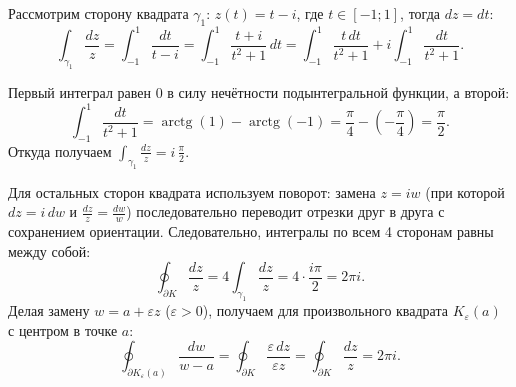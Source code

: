\begin{example} \label{11:int_square}
\hfill \noindent
\par
\begin{minipage}[c]{0.36\textwidth}
\centering
{}
\end{minipage}%
\hfill
\begin{minipage}[c]{0.61\textwidth}
\small
Рассмотрим сторону квадрата $\gamma_1$: $z(t) = t - i$, где $t \in [-1; 1]$, тогда $dz = dt$:
\[
\int_{\gamma_1} \frac{dz}{z} = \int_{-1}^{1} \frac{dt}{t - i} = \int_{-1}^{1} \frac{t + i}{t^2 + 1}
\,dt = \int_{-1}^{1} \frac{t\,dt}{t^2 + 1} + i \int_{-1}^{1} \frac{dt}{t^2 + 1}.
\]

Первый интеграл равен $0$ в силу нечётности подынтегральной функции, а второй:
\[
\int_{-1}^{1} \frac{dt}{t^2 + 1} = \operatorname{arctg}(1) - \operatorname{arctg}(-1) = 
\frac{\pi}{4} - \left(-\frac{\pi}{4}\right) = \frac{\pi}{2}.
\]
Откуда получаем $\displaystyle\int_{\gamma_1} \frac{dz}{z} = i\,\frac{\pi}{2}$.
\end{minipage}

\medskip\noindent
Для остальных сторон квадрата используем поворот: замена $z = iw$ (при которой $dz = i\,dw$ и 
$\frac{dz}{z} = \frac{dw}{w}$) последовательно переводит отрезки друг в друга с сохранением 
ориентации. Следовательно, интегралы по всем 4 сторонам равны между собой:
\[
\oint_{\partial K} \frac{dz}{z} = 4 \int_{\gamma_1} \frac{dz}{z} = 4 \cdot \frac{i\pi}{2} = 2\pi i.
\]
Делая замену $w = a + \varepsilon z$ ($\varepsilon > 0$), получаем для произвольного квадрата 
$K_\varepsilon(a)$ с центром в точке $a$:
\[
\oint_{\partial K_\varepsilon(a)} \frac{dw}{w - a} = \oint_{\partial K} 
\frac{\varepsilon\,dz}{\varepsilon z} = \oint_{\partial K} \frac{dz}{z} = 2\pi i.
\]
\end{example}


